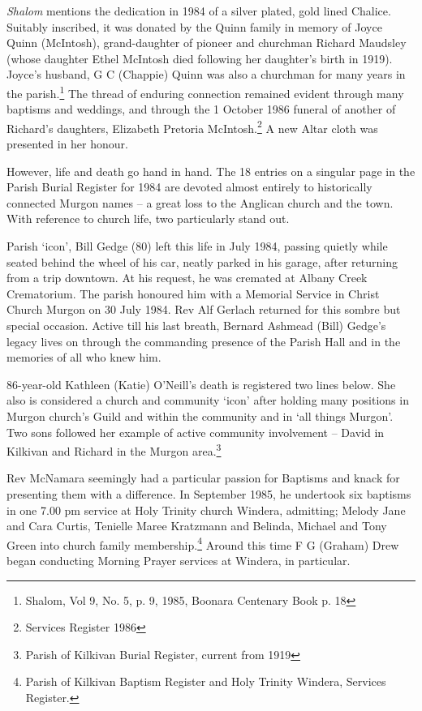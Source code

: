\emph{Shalom} mentions the dedication in 1984 of a silver plated, gold lined Chalice. Suitably inscribed, it was donated by the Quinn family in memory of Joyce Quinn (McIntosh), grand-daughter of pioneer and churchman Richard Maudsley (whose daughter Ethel McIntosh died following her daughter's birth in 1919). Joyce's husband, G C (Chappie) Quinn was also a churchman for many years in the parish.\footnote{Shalom, Vol 9, No. 5, p. 9, 1985, Boonara Centenary Book p. 18} The thread of enduring connection remained evident through many baptisms and weddings, and through the 1 October 1986 funeral of another of Richard's daughters, Elizabeth Pretoria McIntosh.\footnote{Services Register 1986} A new Altar cloth was presented in her honour.


However, life and death go hand in hand. The 18 entries on a singular page in the Parish Burial Register for 1984 are devoted almost entirely to historically connected Murgon names -- a great loss to the Anglican church and the town. With reference to church life, two particularly stand out.



Parish `icon', Bill Gedge (80) left this life in July 1984, passing quietly while seated behind the wheel of his car, neatly parked in his garage, after returning from a trip downtown. At his request, he was cremated at Albany Creek Crematorium. The parish honoured him with a Memorial Service in Christ Church Murgon on 30 July 1984. Rev Alf Gerlach returned for this sombre but special occasion. Active till his last breath, Bernard Ashmead (Bill) Gedge's legacy lives on through the commanding presence of the Parish Hall and in the memories of all who knew him.



86-year-old Kathleen (Katie) O'Neill's death is registered two lines below. She also is considered a church and community `icon' after holding many positions in Murgon church's Guild and within the community and in `all things Murgon'. Two sons followed her example of active community involvement -- David in Kilkivan and Richard in the Murgon area.\footnote{Parish of Kilkivan Burial Register, current from 1919}


Rev McNamara seemingly had a particular passion for Baptisms and knack for presenting them with a difference. In September 1985, he undertook six baptisms in one 7.00 pm service at Holy Trinity church Windera, admitting; Melody Jane and Cara Curtis, Tenielle Maree Kratzmann and Belinda, Michael and Tony Green into church family membership.\footnote{Parish of Kilkivan Baptism Register and Holy Trinity Windera, Services Register.} Around this time F G (Graham) Drew began conducting Morning Prayer services at Windera, in particular.


